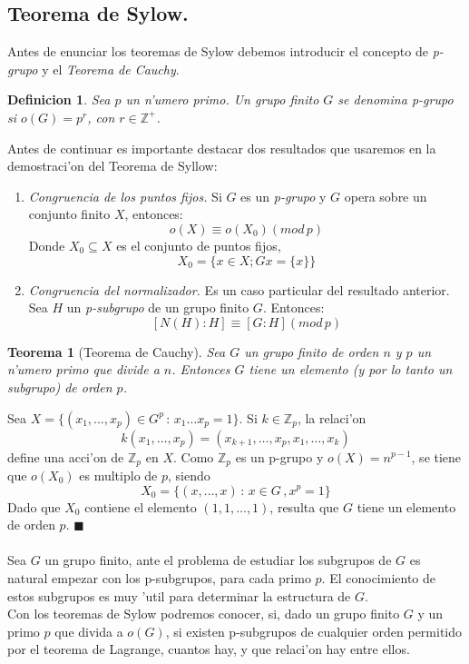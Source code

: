 \documentclass[a4paper,openright,12pt]{report}
\numberwithin{equation}{section} %
\newtheorem{teorema}{Teorema}[section] %
\newtheorem{definicion}{Definicion}[section] %
\newenvironment{proof}{\noindent{\it Demostracion:}}{\hfill$\blacksquare$} %
\begin{document}
\subsection{Teorema de Sylow.}
Antes de enunciar los teoremas de Sylow debemos introducir el concepto de \textit{p-grupo} y el \textit{Teorema de Cauchy}.
\begin{definicion}
Sea $p$ un n'umero primo. Un grupo finito $G$ se denomina \textit{p-grupo} si $o(G)=p^{r}$, con $r \in \mathbb{Z}^{+}$.
\end{definicion}
Antes de continuar es importante destacar dos resultados que usaremos en la demostraci'on del Teorema de Syllow:
\begin{enumerate}
\item \textit{Congruencia de los puntos fijos.} Si $G$ es un \textit{p-grupo} y $G$ opera sobre un conjunto finito $X$, entonces:
\[
o(X) \equiv o(X_{0}) (mod \, p)
\]
Donde $X_{0}\subseteq X$ es el conjunto de puntos fijos, 
\[
X_{0}=\{ x \in X ; Gx = \{x \} \}
\]
\item \textit{Congruencia del normalizador.} Es un caso particular del resultado anterior. Sea $H$ un \textit{p-subgrupo} de un grupo finito $G$. Entonces:
\[
[N(H):H] \equiv [G:H] (mod \, p) 
\]
\end{enumerate}
\begin{teorema}[Teorema de Cauchy]
Sea $G$ un grupo finito de orden $n$ y $p$ un n'umero primo que divide a $n$. Entonces $G$ tiene un elemento (y por lo tanto un subgrupo) de orden $p$.
\end{teorema}
\begin{proof}
Sea $X= \{ (x_{1},\ldots ,x_{p})\in G^{p}\, : \, x_{1}\ldots x_{p}=1\}$. Si $k \in \mathbb{Z}_{p}$, la relaci'on 
\[
k(x_{1},\ldots ,x_{p})=(x_{k+1},\ldots ,x_{p},x_{1},\ldots ,x_{k})
\]
define una acci'on de $\mathbb{Z}_{p}$ en $X$. Como $\mathbb{Z}_{p}$ es un p-grupo y $o(X)=n^{p-1}$, se tiene que $o(X_{0})$ es multiplo de $p$, siendo
\[
X_{0}=\{ (x,\ldots ,x)\, : \, x \in G \, ,x^{p}=1 \}
\]
Dado que $X_{0}$ contiene el elemento $(1, 1, \ldots ,1)$, resulta que $G$ tiene un elemento de orden $p$.
\end{proof}\\
\\
Sea $G$ un grupo finito, ante el problema de estudiar los subgrupos de $G$ es natural empezar con los p-subgrupos, para cada primo $p$. El conocimiento de estos subgrupos es muy 'util para determinar la estructura de $G$. \\
Con los teoremas de Sylow podremos conocer, si, dado un grupo finito $G$ y un primo $p$ que divida a $o(G)$, si existen p-subgrupos de cualquier orden permitido por el teorema de Lagrange, cuantos hay, y que relaci'on hay entre ellos. 
\end{document}
